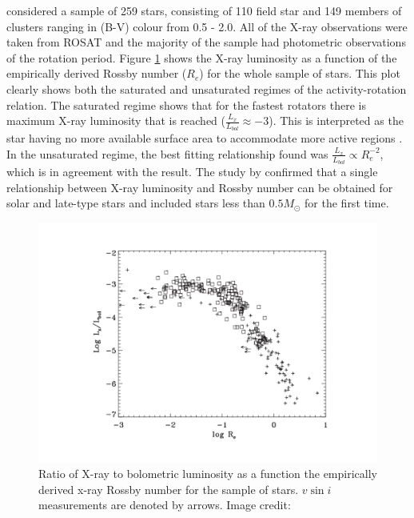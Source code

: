 \citet{Pizzolato_etal_2003} considered a sample of 259 stars, consisting of 110 field star and 149 members of clusters ranging in (B-V) colour from 0.5 - 2.0. All of the X-ray observations were taken from ROSAT and the majority of the sample had photometric observations of the rotation period. Figure \ref{fig:pizzolato_etal_2003_plot} shows the X-ray luminosity as a function of the empirically derived Rossby number ($R_{e}$) for the whole sample of stars. This plot clearly shows both the saturated and unsaturated regimes of the activity-rotation relation. The saturated regime shows that for the fastest rotators there is maximum X-ray luminosity that is reached ($\frac{L_{x}}{L_{bol}} \approx -3$). This is interpreted as the star having no more available surface area to accommodate more active regions \citep{Jardine_Unruh_1999}. In the unsaturated regime, the best fitting relationship found was $\frac{L_{x}}{L_{bol}} \propto R_{e}^{-2}$, which is in agreement with the \citet{Pallavicini_etal_1981} result. The study by \citet{Pizzolato_etal_2003} confirmed that a single relationship between X-ray luminosity and Rossby number can be obtained for solar and late-type stars and included stars less than $0.5 M_{\odot}$ for the first time.

\begin{figure}
    \centering
    \includegraphics[scale=0.55]{Figures/2-Historical_overview/p03_fig_9.pdf}
    \caption[Activity-rotation relationship from \citet{Pizzolato_etal_2003}]{Ratio of X-ray to bolometric luminosity as a function the empirically derived x-ray Rossby number for the \citet{Pizzolato_etal_2003} sample of stars. $v\sin i$ measurements are denoted by arrows. Image credit: \citet{Pizzolato_etal_2003}}
    \label{fig:pizzolato_etal_2003_plot}
\end{figure}

